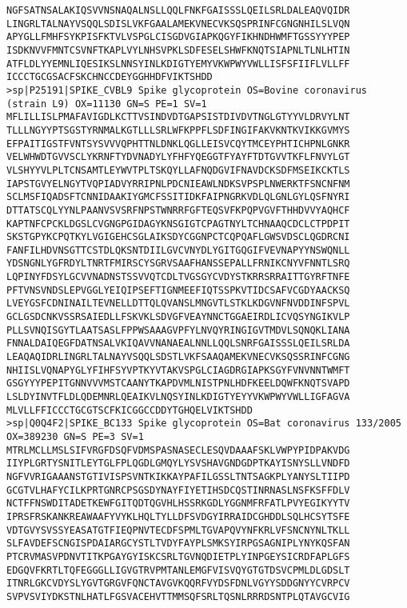 \begin{lstlisting}
NGFSATNSALAKIQSVVNSNAQALNSLLQQLFNKFGAISSSLQEILSRLDALEAQVQIDR
LINGRLTALNAYVSQQLSDISLVKFGAALAMEKVNECVKSQSPRINFCGNGNHILSLVQN
APYGLLFMHFSYKPISFKTVLVSPGLCISGDVGIAPKQGYFIKHNDHWMFTGSSYYYPEP
ISDKNVVFMNTCSVNFTKAPLVYLNHSVPKLSDFESELSHWFKNQTSIAPNLTLNLHTIN
ATFLDLYYEMNLIQESIKSLNNSYINLKDIGTYEMYVKWPWYVWLLISFSFIIFLVLLFF
ICCCTGCGSACFSKCHNCCDEYGGHHDFVIKTSHDD
>sp|P25191|SPIKE_CVBL9 Spike glycoprotein OS=Bovine coronavirus (strain L9) OX=11130 GN=S PE=1 SV=1
MFLILLISLPMAFAVIGDLKCTTVSINDVDTGAPSISTDIVDVTNGLGTYYVLDRVYLNT
TLLLNGYYPTSGSTYRNMALKGTLLLSRLWFKPPFLSDFINGIFAKVKNTKVIKKGVMYS
EFPAITIGSTFVNTSYSVVVQPHTTNLDNKLQGLLEISVCQYTMCEYPHTICHPNLGNKR
VELWHWDTGVVSCLYKRNFTYDVNADYLYFHFYQEGGTFYAYFTDTGVVTKFLFNVYLGT
VLSHYYVLPLTCNSAMTLEYWVTPLTSKQYLLAFNQDGVIFNAVDCKSDFMSEIKCKTLS
IAPSTGVYELNGYTVQPIADVYRRIPNLPDCNIEAWLNDKSVPSPLNWERKTFSNCNFNM
SCLMSFIQADSFTCNNIDAAKIYGMCFSSITIDKFAIPNGRKVDLQLGNLGYLQSFNYRI
DTTATSCQLYYNLPAANVSVSRFNPSTWNRRFGFTEQSVFKPQPVGVFTHHDVVYAQHCF
KAPTNFCPCKLDGSLCVGNGPGIDAGYKNSGIGTCPAGTNYLTCHNAAQCDCLCTPDPIT
SKSTGPYKCPQTKYLVGIGEHCSGLAIKSDYCGGNPCTCQPQAFLGWSVDSCLQGDRCNI
FANFILHDVNSGTTCSTDLQKSNTDIILGVCVNYDLYGITGQGIFVEVNAPYYNSWQNLL
YDSNGNLYGFRDYLTNRTFMIRSCYSGRVSAAFHANSSEPALLFRNIKCNYVFNNTLSRQ
LQPINYFDSYLGCVVNADNSTSSVVQTCDLTVGSGYCVDYSTKRRSRRAITTGYRFTNFE
PFTVNSVNDSLEPVGGLYEIQIPSEFTIGNMEEFIQTSSPKVTIDCSAFVCGDYAACKSQ
LVEYGSFCDNINAILTEVNELLDTTQLQVANSLMNGVTLSTKLKDGVNFNVDDINFSPVL
GCLGSDCNKVSSRSAIEDLLFSKVKLSDVGFVEAYNNCTGGAEIRDLICVQSYNGIKVLP
PLLSVNQISGYTLAATSASLFPPWSAAAGVPFYLNVQYRINGIGVTMDVLSQNQKLIANA
FNNALDAIQEGFDATNSALVKIQAVVNANAEALNNLLQQLSNRFGAISSSLQEILSRLDA
LEAQAQIDRLINGRLTALNAYVSQQLSDSTLVKFSAAQAMEKVNECVKSQSSRINFCGNG
NHIISLVQNAPYGLYFIHFSYVPTKYVTAKVSPGLCIAGDRGIAPKSGYFVNVNNTWMFT
GSGYYYPEPITGNNVVVMSTCAANYTKAPDVMLNISTPNLHDFKEELDQWFKNQTSVAPD
LSLDYINVTFLDLQDEMNRLQEAIKVLNQSYINLKDIGTYEYYVKWPWYVWLLIGFAGVA
MLVLLFFICCCTGCGTSCFKICGGCCDDYTGHQELVIKTSHDD
>sp|Q0Q4F2|SPIKE_BC133 Spike glycoprotein OS=Bat coronavirus 133/2005 OX=389230 GN=S PE=3 SV=1
MTRLMCLLMSLSIFVRGFDSQFVDMSPASNASECLESQVDAAAFSKLVWPYPIDPAKVDG
IIYPLGRTYSNITLEYTGLFPLQGDLGMQYLYSVSHAVGNDGDPTKAYISNYSLLVNDFD
NGFVVRIGAAANSTGTIVISPSVNTKIKKAYPAFILGSSLTNTSAGKPLYANYSLTIIPD
GCGTVLHAFYCILKPRTGNRCPSGSDYNAYFIYETIHSDCQSTINRNASLNSFKSFFDLV
NCTFFNSWDITADETKEWFGITQDTQGVHLHSSRKGDLYGGNMFRFATLPVYEGIKYYTV
IPRSFRSKANKREAWAAFYVYKLHQLTYLLDFSVDGYIRRAIDCGHDDLSQLHCSYTSFE
VDTGVYSVSSYEASATGTFIEQPNVTECDFSPMLTGVAPQVYNFKRLVFSNCNYNLTKLL
SLFAVDEFSCNGISPDAIARGCYSTLTVDYFAYPLSMKSYIRPGSAGNIPLYNYKQSFAN
PTCRVMASVPDNVTITKPGAYGYISKCSRLTGVNQDIETPLYINPGEYSICRDFAPLGFS
EDGQVFKRTLTQFEGGGLLIGVGTRVPMTANLEMGFVISVQYGTGTDSVCPMLDLGDSLT
ITNRLGKCVDYSLYGVTGRGVFQNCTAVGVKQQRFVYDSFDNLVGYYSDDGNYYCVRPCV
SVPVSVIYDKSTNLHATLFGSVACEHVTTMMSQFSRLTQSNLRRRDSNTPLQTAVGCVIG

\end{lstlisting}
